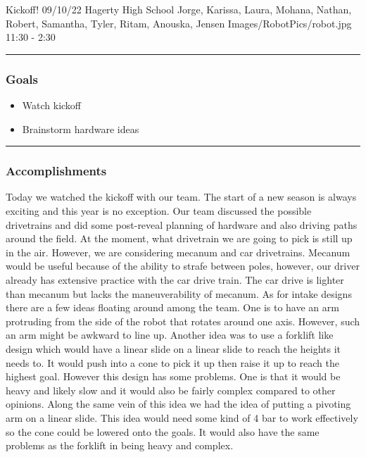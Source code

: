 \insertmeeting 
	{Kickoff!} 
	{09/10/22} 
	{Hagerty High School}
	{Jorge, Karissa, Laura, Mohana, Nathan, Robert, Samantha, Tyler, Ritam, Anouska, Jensen}
	{Images/RobotPics/robot.jpg}
	{11:30 - 2:30}
	
\noindent\hfil\rule{\textwidth}{.4pt}\hfil
\subsubsection*{Goals}
\begin{itemize}
    \item Watch kickoff
    \item Brainstorm hardware ideas

\end{itemize} 

\noindent\hfil\rule{\textwidth}{.4pt}\hfil

\subsubsection*{Accomplishments}
Today we watched the kickoff with our team. The start of a new season is always exciting and this year is no exception. Our team discussed the possible drivetrains and did some post-reveal planning of hardware and also driving paths around the field. At the moment, what drivetrain we are going to pick is still up in the air. However, we are considering mecanum and car drivetrains. Mecanum would be useful because of the ability to strafe between poles, however, our driver already has extensive practice with the car drive train. The car drive is lighter than mecanum but lacks the maneuverability of mecanum. As for intake designs there are a few ideas floating around among the team. One is to have an arm protruding from the side of the robot that rotates around one axis. 
However, such an arm might be awkward to line up. Another idea was to use a forklift like design which would have a linear slide on a linear slide to reach the heights it needs to. It would push into a cone to pick it up then raise it up to reach the highest goal. However this design has some problems. One is that it would be heavy and likely slow and it would also be fairly complex compared to other opinions. Along the same vein of this idea we had the idea of putting a pivoting arm on a linear slide. This idea would need some kind of 4 bar to work effectively so the cone could be lowered onto the goals. It would also have the same problems as the forklift in being heavy and complex.



